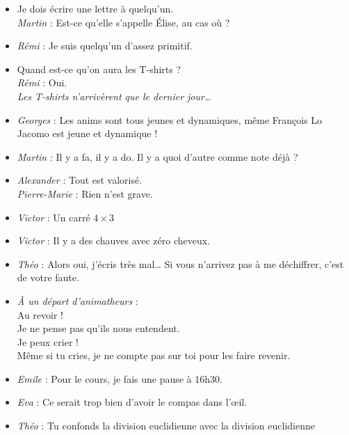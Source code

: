 \begin{itemize}
\item \og Je dois écrire une lettre à quelqu'un. \fg \\
\textit{Martin} : \og Est-ce qu'elle s'appelle Élise, au cas où ? \fg

\item \textit{Rémi} : \og Je suis quelqu'un d'assez primitif. \fg

 \item \og Quand est-ce qu'on aura les T-shirts ? \fg \\
\textit{Rémi} : \og Oui. \fg \\
\textit{Les T-shirts n'arrivèrent que le dernier jour…}

\item \textit{Georges} : \og Les anims sont tous jeunes et dynamiques, même François Lo Jacomo est jeune et dynamique ! \fg

\item \textit{Martin} : \og Il y a fa, il y a do. Il y a quoi d'autre comme note déjà ? \fg

\item \textit{Alexander} : \og Tout est valorisé. \fg \\
\textit{Pierre-Marie} : \og Rien n'est grave. \fg

\item \textit{Victor} : \og Un carré $4\times 3$ \fg

\item \textit{Victor} : \og Il y a des chauves avec zéro cheveux. \fg

\item \textit{Théo} : \og Alors oui, j'écris très mal… Si vous n'arrivez pas à me déchiffrer, c'est de votre faute. \fg

\item \textit{À un départ d'animatheurs} : \\
\og Au revoir ! \fg \\
\og Je ne pense pas qu'ils nous entendent. \fg \\
\og Je peux crier ! \fg \\
\og Même si tu cries, je ne compte pas sur toi pour les faire revenir. \fg

\item \textit{Emile} : \og Pour le cours, je fais une pause à 16h30. \fg

\item \textit{Eva} : \og Ce serait trop bien d'avoir le compas dans l'œil. \fg

\item \textit{Théo} : \og Tu confonds la division euclidienne avec la division euclidienne \fg


\end{itemize}

